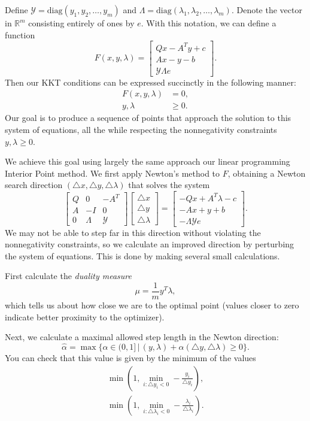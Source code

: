 Define $\mathcal{Y} = \text{diag}(y_1,y_2,\ldots,y_m)$ and $\Lambda = \text{diag}(\lambda_1,\lambda_2,\ldots,\lambda_m)$.
Denote the vector in $\mathbb{R}^m$ consisting entirely of ones by $e$. With this notation, we can define a function
\[
F(x,y,\lambda) =
\begin{bmatrix}
Qx-A^Ty + c\\
Ax-y-b\\
\mathcal{Y}\Lambda e
\end{bmatrix}.
\]
Then our KKT conditions can be expressed succinctly in the following manner:
\begin{align*}
F(x,y,\lambda) &= 0,\\
y,\lambda &\geq 0.
\end{align*}
Our goal is to produce a sequence of points that approach the solution to this system of equations, all the while
respecting the nonnegativity constraints $y,\lambda \geq 0$.

We achieve this goal using largely the same approach our linear programming Interior Point method.
We first apply Newton's method to $F$, obtaining a Newton search direction $(\triangle x, \triangle y, \triangle \lambda)$
that solves the system
\begin{equation}
\begin{bmatrix}
Q & 0 & -A^T\\
A & -I & 0\\
0 & \Lambda & \mathcal{Y}
\end{bmatrix}
\begin{bmatrix}
\triangle x\\
\triangle y\\
\triangle \lambda
\end{bmatrix}
=
\begin{bmatrix}
-Qx + A^T\lambda - c\\
-Ax + y + b\\
-\Lambda\mathcal{Y}e
\end{bmatrix}.
\label{eq:affine}
\end{equation}
We may not be able to step far in this direction without violating the nonnegativity constraints, so we calculate
an improved direction by perturbing the system of equations. This is done by making several small calculations.

First calculate the \emph{duality measure}
\[
\mu = \frac{1}{m}y^T\lambda,
\]
which tells us about how close we are to the optimal point (values closer to zero indicate better proximity to the optimizer).

Next, we calculate a maximal allowed step length in the Newton direction:
\[
\hat{\alpha} = \max \{\alpha \in (0,1] \, | \, (y,\lambda) + \alpha(\triangle y, \triangle \lambda) \geq 0\}.
\]
You can check that this value is given by the minimum of the values
\begin{align*}
\min\left(1, \min_{i : \triangle y_i < 0} - \frac{y_i}{\triangle y_i}\right),\\
\min\left(1, \min_{i : \triangle \lambda_i < 0} -\frac{\lambda_i}{\triangle \lambda_i}\right).
\end{align*}

